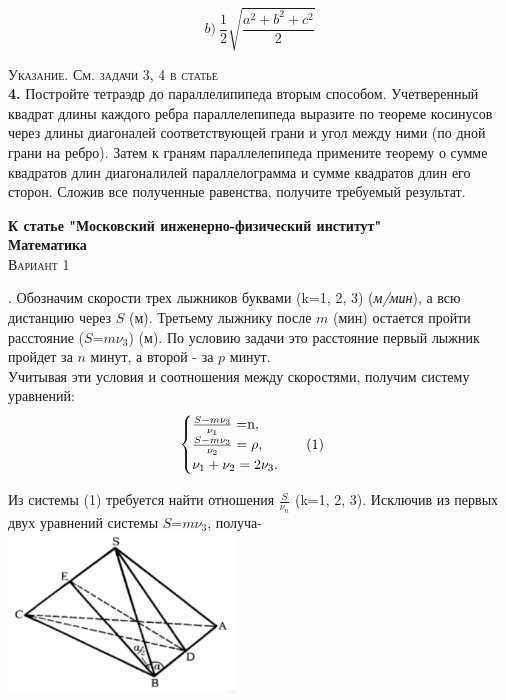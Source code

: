 \begin{multicols}{2}

\begin{equation*}
    b)~\frac{1}{2} \sqrt{\frac{a^2 + b^2 + c^2}{2}}
\end{equation*}

\textsc{Указание. См. задачи 3, 4 в статье }\\
\indent \textbf{4. } Постройте тетраэдр до параллелипипеда вторым способом. 
Учетверенный квадрат длины каждого ребра параллелепипеда выразите по теореме косинусов через длины диагоналей
соответствующей грани и угол между ними (по дной грани на ребро).
Затем к граням параллелепипеда примените теорему о сумме квадратов длин диагоналилей параллелограмма
и сумме квадратов длин его сторон. Сложив все полученные равенства, получите требуемый результат. 

\vspace{0.5cm}
\begin{flushleft}
\textbf{К статье "Московский инженерно-физический институт"}\\
\vspace{0.2cm}
\textbf{Математика}\\
\vspace{0.2cm}
\textsc{Вариант 1}
\end{flushleft}

. Обозначим скорости трех лыжников буквами (k=1, 2, 3) (\textit{м/мин}), а всю дистанцию через $S$ (м).
Третьему лыжнику после $m$ (мин) остается пройти расстояние ($S$=$m\nu_3$) (м).
По условию задачи это расстояние первый лыжник пройдет за $n$ минут, а второй - за $p$ минут.\\
\indent Учитывая эти условия и соотношения между скоростями, получим систему уравнений:
\begin{equation*}
 \begin{cases}
   \frac{S-m\nu_3}{\nu_1} = $n$,\\
   \frac{S-m\nu_3}{\nu_2} = \rho, \indent \indent (1) \\
   \nu_1 + \nu_2 = 2\nu_3.
 \end{cases}
\end{equation*}

Из системы (1) требуется найти отношения $\frac{S}{\nu_n}$
(k=1, 2, 3). Исключив из первых двух уравнений системы $S$=$m\nu_3$, получа-\\
\includegraphics[width=0.45\textwidth]{scheme.png}



\end{multicols}

